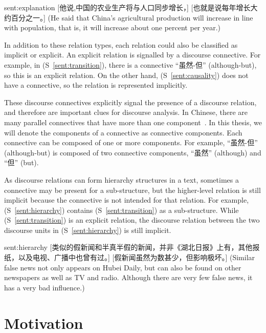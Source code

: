 \begin{sent}{sent:explanation}{}
    [他说,中国的农业生产将与人口同步增长，] [也就是说每年增长大约百分之一。]
    (He said that China's agricultural production will increase in line with
    population, that is, it will increase about one percent per year.)
\end{sent}

In addition to these relation types, each relation could also be classified
as implicit or explicit. An explicit relation is signalled by a discourse connective.
For example, in (S~\ref{sent:transition}), there is a connective ``虽然-但''
(although-but), so this is an explicit relation. On the other hand,
(S~\ref{sent:causality}) does not have a connective, so the relation
is represented implicitly.

These discourse connectives explicitly signal the presence of a discourse relation,
and therefore are important clues for discourse analysis.
In Chinese, there are many parallel connectives that have more than one
component~\citep{zhou2012pdtb}.
In this thesis, we will denote the components of a connective as connective components.
Each connective can be composed of one or more components. For example, ``虽然-但''
(although-but) is composed of two connective components, ``虽然'' (although)
and ``但'' (but).

As discourse relations can form hierarchy structures in a text, sometimes
a connective may be present for a sub-structure, but the higher-level relation
is still implicit because the connective is not intended for that relation.
For example, (S~\ref{sent:hierarchy}) contains (S~\ref{sent:transition})
as a sub-structure. While (S~\ref{sent:transition}) is an explicit relation,
the discourse relation between the two discourse units in (S~\ref{sent:hierarchy})
is still implicit.

\begin{sent}{sent:hierarchy}{}
    [类似的假新闻和半真半假的新闻，并非《湖北日报》上有，其他报纸，以及电视、广播中也曾有过。]
    [假新闻虽然为数甚少，但影响极坏。]
    (Similar false news not only appears on Hubei Daily, but can also be found on
    other newspapers as well as TV and radio.
    Although there are very few false news, it has a very bad influence.)
\end{sent}



%
%
\section{Motivation}

